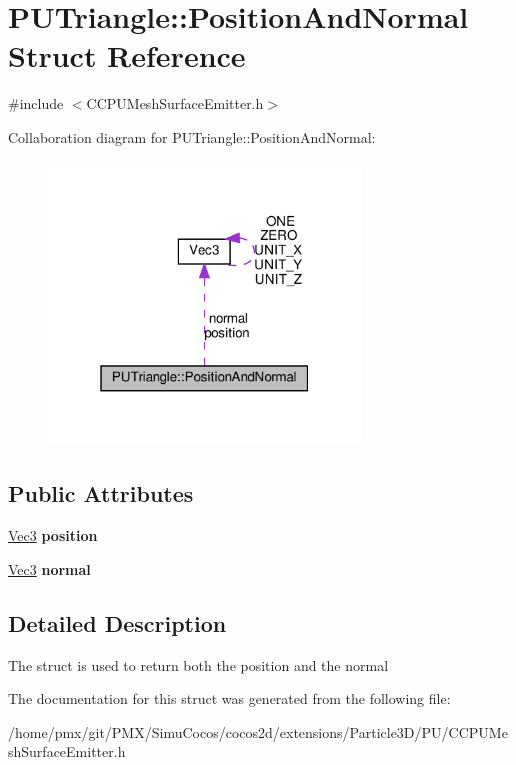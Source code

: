 \hypertarget{structPUTriangle_1_1PositionAndNormal}{}\section{P\+U\+Triangle\+:\+:Position\+And\+Normal Struct Reference}
\label{structPUTriangle_1_1PositionAndNormal}


{\ttfamily \#include $<$C\+C\+P\+U\+Mesh\+Surface\+Emitter.\+h$>$}



Collaboration diagram for P\+U\+Triangle\+:\+:Position\+And\+Normal\+:
\nopagebreak
\begin{figure}[H]
\begin{center}
\leavevmode
\includegraphics[width=235pt]{structPUTriangle_1_1PositionAndNormal__coll__graph}
\end{center}
\end{figure}
\subsection*{Public Attributes}
\begin{DoxyCompactItemize}
\item 
\mbox{\label{structPUTriangle_1_1PositionAndNormal_af576288279471234c3995d3e2bb723d0}} 
\hyperlink{classVec3}{Vec3} {\bfseries position}
\item 
\mbox{\label{structPUTriangle_1_1PositionAndNormal_a7aded1bd1cdd57934405b529d84b5312}} 
\hyperlink{classVec3}{Vec3} {\bfseries normal}
\end{DoxyCompactItemize}


\subsection{Detailed Description}
The struct is used to return both the position and the normal 

The documentation for this struct was generated from the following file\+:\begin{DoxyCompactItemize}
\item 
/home/pmx/git/\+P\+M\+X/\+Simu\+Cocos/cocos2d/extensions/\+Particle3\+D/\+P\+U/C\+C\+P\+U\+Mesh\+Surface\+Emitter.\+h\end{DoxyCompactItemize}
